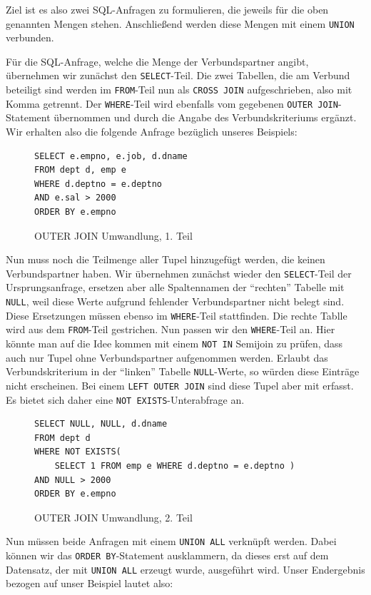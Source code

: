 Ziel ist es also zwei SQL-Anfragen zu formulieren, die jeweils für die oben genannten Mengen stehen. Anschließend werden diese Mengen mit einem \verb|UNION| verbunden.

Für die SQL-Anfrage, welche die Menge der Verbundspartner angibt, übernehmen wir zunächst den \verb|SELECT|-Teil. Die zwei Tabellen, die am Verbund beteiligt sind werden im \verb|FROM|-Teil nun als \verb|CROSS JOIN| aufgeschrieben, also mit Komma getrennt. Der \verb|WHERE|-Teil wird ebenfalls vom gegebenen \verb|OUTER JOIN|-Statement übernommen und durch die Angabe des Verbundskriteriums ergänzt.
Wir erhalten also die folgende Anfrage bezüglich unseres Beispiels:

\begin{figure}[h]
\begin{verbatim}
SELECT e.empno, e.job, d.dname 
FROM dept d, emp e
WHERE d.deptno = e.deptno
AND e.sal > 2000
ORDER BY e.empno
\end{verbatim}
\caption{OUTER JOIN Umwandlung, 1. Teil}
\end{figure}

Nun muss noch die Teilmenge aller Tupel hinzugefügt werden, die keinen Verbundspartner haben. Wir übernehmen zunächst wieder den \verb|SELECT|-Teil der Ursprungsanfrage, ersetzen aber alle Spaltennamen der ``rechten'' Tabelle mit \verb|NULL|, weil diese Werte aufgrund fehlender Verbundspartner nicht belegt sind. Diese Ersetzungen müssen ebenso im \verb|WHERE|-Teil stattfinden. Die rechte Tablle wird aus dem \verb|FROM|-Teil gestrichen. Nun passen wir den \verb|WHERE|-Teil an. Hier könnte man auf die Idee kommen mit einem \verb|NOT IN| Semijoin zu prüfen, dass auch nur Tupel ohne Verbundspartner aufgenommen werden. Erlaubt  das Verbundskriterium in der ``linken'' Tabelle \verb|NULL|-Werte, so würden diese Einträge nicht erscheinen. Bei einem \verb|LEFT OUTER JOIN| sind diese Tupel aber mit erfasst. Es bietet sich daher eine \verb|NOT EXISTS|-Unterabfrage an. 

\begin{figure}[h]
\begin{verbatim}
SELECT NULL, NULL, d.dname
FROM dept d 
WHERE NOT EXISTS(
    SELECT 1 FROM emp e WHERE d.deptno = e.deptno )
AND NULL > 2000
ORDER BY e.empno
\end{verbatim}
\caption{OUTER JOIN Umwandlung, 2. Teil}
\end{figure}

Nun müssen beide Anfragen mit einem \verb|UNION ALL| verknüpft werden. Dabei können wir das \verb|ORDER BY|-Statement ausklammern, da dieses erst auf dem Datensatz, der mit \verb|UNION ALL| erzeugt wurde, ausgeführt wird. Unser Endergebnis bezogen auf unser Beispiel lautet also:

